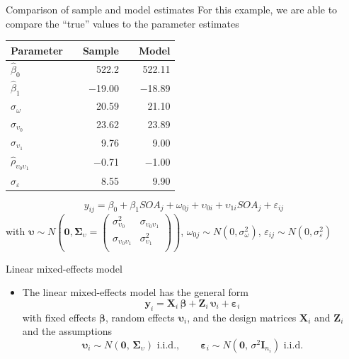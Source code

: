 \documentclass[aspectratio=169]{beamer}
\newcommand{\vect}[1]{\mathbf{#1}}
\newcommand{\mat}[1]{\mathbf{#1}}
\newcommand{\gvect}[1]{\boldsymbol{#1}}
\newcommand{\gmat}[1]{\boldsymbol{#1}}
\begin{document}
\begin{frame}{Comparison of sample and model estimates}
  For this example, we are able to compare the ``true'' values to the
  parameter estimates
  \begin{center}
  \begin{tabular}{lrrrr}
    \hline
    Parameter && Sample && Model \\
    \hline
    $\hat\beta_0$ && 522.2 && 522.11\\
    $\hat\beta_1$ && $-$19.00 && $-$18.89\\
    $\hat\sigma_{\omega}$ && 20.59 && 21.10\\
    $\hat\sigma_{\upsilon_0}$ && 23.62 && 23.89\\
    $\hat\sigma_{\upsilon_1}$ && 9.76 && 9.00\\
    $\hat\rho_{\upsilon_0\upsilon_1}$ && $-$0.71 && $-$1.00\\
    $\hat\sigma_{\varepsilon}$ && 8.55 && 9.90\\
    \hline
  \end{tabular}
  \end{center}
     \[
       y_{ij} = \beta_0 + \beta_1 SOA_j + \omega_{0j} + \upsilon_{0i} +
       \upsilon_{1i} SOA_j + \varepsilon_{ij} 
  \]
\small
with $\gvect{\upsilon} \sim N\left(\gvect{0}, \gmat{\Sigma}_{\upsilon} = 
    \begin{pmatrix}
      \sigma^2_{\upsilon_0} & \sigma_{\upsilon_0\upsilon_1} \\
      \sigma_{\upsilon_0\upsilon_1} & \sigma^2_{\upsilon_1} \\
    \end{pmatrix}\right)$,
  $\omega_{0j} \sim N(0, \sigma_{\omega}^2)$, $\varepsilon_{ij} \sim N(0,
  \sigma_{\varepsilon}^2)$ 
\end{frame}


\begin{frame}{Linear mixed-effects model}
  \begin{itemize}
    \item The linear mixed-effects model has the general form
\[
  \vect{y}_i = \mat{X}_i \, \gvect{\beta} + \mat{Z}_i \, \gvect{\upsilon}_i +
               \gvect{\varepsilon}_i
\]
with fixed effects $\gvect{\beta}$, random effects
$\gvect{\upsilon}_i$, and the design matrices $\mat{X}_i$ and $\mat{Z}_i$
  and the assumptions
\[
  \gvect{\upsilon}_i \sim N(\vect{0}, \, \gmat{\Sigma}_\upsilon)
    \text{ i.i.d.}, \qquad
  \gvect{\varepsilon}_i \sim N(\vect{0}, \, \sigma^2 \mat{I}_{n_i})
    \text{ i.i.d.}
\]
  \end{itemize}
\end{frame}
\end{document}
